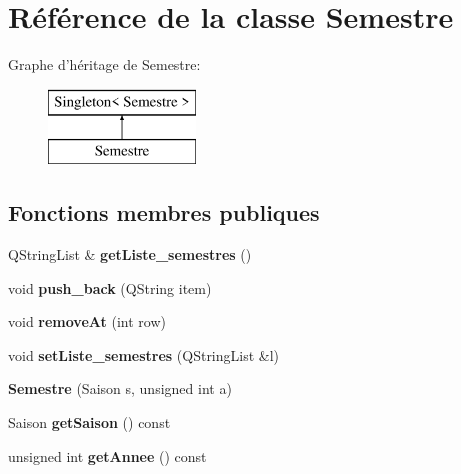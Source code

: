 \hypertarget{class_semestre}{\section{Référence de la classe Semestre}
\label{class_semestre}
}
Graphe d'héritage de Semestre\+:\begin{figure}[H]
\begin{center}
\leavevmode
\includegraphics[height=2.000000cm]{class_semestre}
\end{center}
\end{figure}
\subsection*{Fonctions membres publiques}
\begin{DoxyCompactItemize}
\item 
\hypertarget{class_semestre_a9f78b2bd60c50f33226f741ff84a3d20}{Q\+String\+List \& {\bfseries get\+Liste\+\_\+semestres} ()}\label{class_semestre_a9f78b2bd60c50f33226f741ff84a3d20}

\item 
\hypertarget{class_semestre_afede7f0925e23cabac2625334450f50c}{void {\bfseries push\+\_\+back} (Q\+String item)}\label{class_semestre_afede7f0925e23cabac2625334450f50c}

\item 
\hypertarget{class_semestre_a82fa2036ff248389144a17dc73f6eb94}{void {\bfseries remove\+At} (int row)}\label{class_semestre_a82fa2036ff248389144a17dc73f6eb94}

\item 
\hypertarget{class_semestre_a276b752f301b59c8164528ef1e94a13e}{void {\bfseries set\+Liste\+\_\+semestres} (Q\+String\+List \&l)}\label{class_semestre_a276b752f301b59c8164528ef1e94a13e}

\item 
\hypertarget{class_semestre_a4a0f1d3ab2f65755e0e0f610526522c2}{{\bfseries Semestre} (Saison s, unsigned int a)}\label{class_semestre_a4a0f1d3ab2f65755e0e0f610526522c2}

\item 
\hypertarget{class_semestre_a26e25575e7fb65649c47970a9800c3aa}{Saison {\bfseries get\+Saison} () const }\label{class_semestre_a26e25575e7fb65649c47970a9800c3aa}

\item 
\hypertarget{class_semestre_a5aa85395e97f58f491ebf251da8231ef}{unsigned int {\bfseries get\+Annee} () const }\label{class_semestre_a5aa85395e97f58f491ebf251da8231ef}

\end{DoxyCompactItemize}

